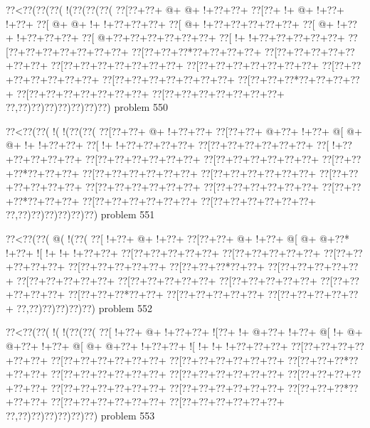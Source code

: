 \vbox{\vbox{\goo
\0??<\0??(\0??(\0??(\- !(\0??(\0??(\0??(
\0??[\0??+\0??+\- @+\- @+\- !+\0??+\0??+
\0??[\0??+\- !+\- @+\- !+\0??+\- !+\0??+
\0??[\- @+\- @+\- !+\- !+\0??+\0??+\0??+
\0??[\- @+\- !+\0??+\0??+\0??+\0??+\0??+
\0??[\- @+\- !+\0??+\- !+\0??+\0??+\0??+
\0??[\- @+\0??+\0??+\0??+\0??+\0??+\0??+
\0??[\- !+\- !+\0??+\0??+\0??+\0??+\0??+
\0??[\0??+\0??+\0??+\0??+\0??+\0??+\0??+
\0??[\0??+\0??+\0??*\0??+\0??+\0??+\0??+
\0??[\0??+\0??+\0??+\0??+\0??+\0??+\0??+
\0??[\0??+\0??+\0??+\0??+\0??+\0??+\0??+
\0??[\0??+\0??+\0??+\0??+\0??+\0??+\0??+
\0??[\0??+\0??+\0??+\0??+\0??+\0??+\0??+
\0??[\0??+\0??+\0??+\0??+\0??+\0??+\0??+
\0??[\0??+\0??+\0??*\0??+\0??+\0??+\0??+
\0??[\0??+\0??+\0??+\0??+\0??+\0??+\0??+
\0??[\0??+\0??+\0??+\0??+\0??+\0??+\0??+
\0??,\0??)\0??)\0??)\0??)\0??)\0??)\0??)
}
\hfil problem 550\hfil\break
}

\vbox{\vbox{\goo
\0??<\0??(\0??(\- !(\- !(\0??(\0??(
\0??[\0??+\0??+\- @+\- !+\0??+\0??+
\0??[\0??+\0??+\- @+\0??+\- !+\0??+
\- @[\- @+\- @+\- !+\- !+\0??+\0??+
\0??[\- !+\- !+\0??+\0??+\0??+\0??+
\0??[\0??+\0??+\0??+\0??+\0??+\0??+
\0??[\- !+\0??+\0??+\0??+\0??+\0??+
\0??[\0??+\0??+\0??+\0??+\0??+\0??+
\0??[\0??+\0??+\0??+\0??+\0??+\0??+
\0??[\0??+\0??+\0??*\0??+\0??+\0??+
\0??[\0??+\0??+\0??+\0??+\0??+\0??+
\0??[\0??+\0??+\0??+\0??+\0??+\0??+
\0??[\0??+\0??+\0??+\0??+\0??+\0??+
\0??[\0??+\0??+\0??+\0??+\0??+\0??+
\0??[\0??+\0??+\0??+\0??+\0??+\0??+
\0??[\0??+\0??+\0??*\0??+\0??+\0??+
\0??[\0??+\0??+\0??+\0??+\0??+\0??+
\0??[\0??+\0??+\0??+\0??+\0??+\0??+
\0??,\0??)\0??)\0??)\0??)\0??)\0??)
}
\hfil problem 551\hfil\break
}

\vbox{\vbox{\goo
\0??<\0??(\0??(\- @(\- !(\0??(
\0??[\- !+\0??+\- @+\- !+\0??+
\0??[\0??+\0??+\- @+\- !+\0??+
\- @[\- @+\- @+\0??*\- !+\0??+
\- ![\- !+\- !+\- !+\0??+\0??+
\0??[\0??+\0??+\0??+\0??+\0??+
\0??[\0??+\0??+\0??+\0??+\0??+
\0??[\0??+\0??+\0??+\0??+\0??+
\0??[\0??+\0??+\0??+\0??+\0??+
\0??[\0??+\0??+\0??*\0??+\0??+
\0??[\0??+\0??+\0??+\0??+\0??+
\0??[\0??+\0??+\0??+\0??+\0??+
\0??[\0??+\0??+\0??+\0??+\0??+
\0??[\0??+\0??+\0??+\0??+\0??+
\0??[\0??+\0??+\0??+\0??+\0??+
\0??[\0??+\0??+\0??*\0??+\0??+
\0??[\0??+\0??+\0??+\0??+\0??+
\0??[\0??+\0??+\0??+\0??+\0??+
\0??,\0??)\0??)\0??)\0??)\0??)
}
\hfil problem 552\hfil\break
}

\vbox{\vbox{\goo
\0??<\0??(\0??(\- !(\- !(\0??(\0??(
\0??[\- !+\0??+\- @+\- !+\0??+\0??+
\- ![\0??+\- !+\- @+\0??+\- !+\0??+
\- @[\- !+\- @+\- @+\0??+\- !+\0??+
\- @[\- @+\- @+\0??+\- !+\0??+\0??+
\- ![\- !+\- !+\- !+\0??+\0??+\0??+
\0??[\0??+\0??+\0??+\0??+\0??+\0??+
\0??[\0??+\0??+\0??+\0??+\0??+\0??+
\0??[\0??+\0??+\0??+\0??+\0??+\0??+
\0??[\0??+\0??+\0??*\0??+\0??+\0??+
\0??[\0??+\0??+\0??+\0??+\0??+\0??+
\0??[\0??+\0??+\0??+\0??+\0??+\0??+
\0??[\0??+\0??+\0??+\0??+\0??+\0??+
\0??[\0??+\0??+\0??+\0??+\0??+\0??+
\0??[\0??+\0??+\0??+\0??+\0??+\0??+
\0??[\0??+\0??+\0??*\0??+\0??+\0??+
\0??[\0??+\0??+\0??+\0??+\0??+\0??+
\0??[\0??+\0??+\0??+\0??+\0??+\0??+
\0??,\0??)\0??)\0??)\0??)\0??)\0??)
}
\hfil problem 553\hfil\break
}

